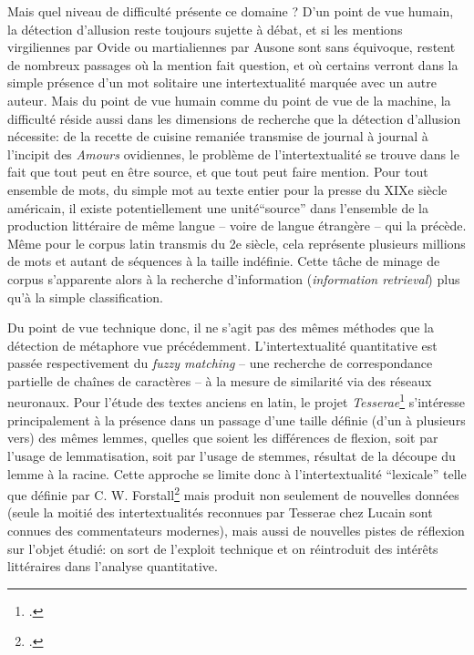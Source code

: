 
Mais quel niveau de difficulté présente ce domaine ? D'un point de vue humain, la détection d'allusion reste toujours sujette à débat, et si les mentions virgiliennes par Ovide ou martialiennes par Ausone sont sans équivoque, restent de nombreux passages où la mention fait question, et où certains verront dans la simple présence d'un mot solitaire une intertextualité marquée avec un autre auteur. Mais du point de vue humain comme du point de vue de la machine, la difficulté réside aussi dans les dimensions de recherche que la détection d'allusion nécessite: de la recette de cuisine remaniée transmise de journal à journal à l'incipit des \textit{Amours} ovidiennes, le problème de l'intertextualité se trouve dans le fait que tout peut en être source, et que tout peut faire mention. Pour tout ensemble de mots, du simple mot au texte entier pour la presse du XIXe siècle américain, il existe potentiellement une unité\enquote{source} dans l'ensemble de la production littéraire de même langue -- voire de langue étrangère -- qui la précède. Même pour le corpus latin transmis du 2e siècle, cela représente plusieurs millions de mots et autant de séquences à la taille indéfinie. Cette tâche de minage de corpus s'apparente alors à la recherche d'information (\textit{information retrieval}) plus qu'à la simple classification.

Du point de vue technique donc, il ne s'agit pas des mêmes méthodes que la détection de métaphore vue précédemment. L'intertextualité quantitative est passée respectivement du \textit{fuzzy matching} -- une recherche de correspondance partielle de chaînes de caractères -- à la mesure de similarité via des réseaux neuronaux. Pour l'étude des textes anciens en latin, le projet \textit{Tesserae}\footcite{coffee_tesserae_2013} s'intéresse principalement à la présence dans un passage d'une taille définie (d'un à plusieurs vers) des mêmes lemmes, quelles que soient les différences de flexion, soit par l'usage de lemmatisation, soit par l'usage de stemmes, résultat de la découpe du lemme à la racine. Cette approche se limite donc à l'intertextualité \enquote{lexicale} telle que définie par C. W. Forstall\footcite{forstall_quantitative_2019} mais produit non seulement de nouvelles données (seule la moitié des intertextualités reconnues par Tesserae chez Lucain sont connues des commentateurs modernes), mais aussi de nouvelles pistes de réflexion sur l'objet étudié: on sort de l'exploit technique et on réintroduit des intérêts littéraires dans l'analyse quantitative. 

